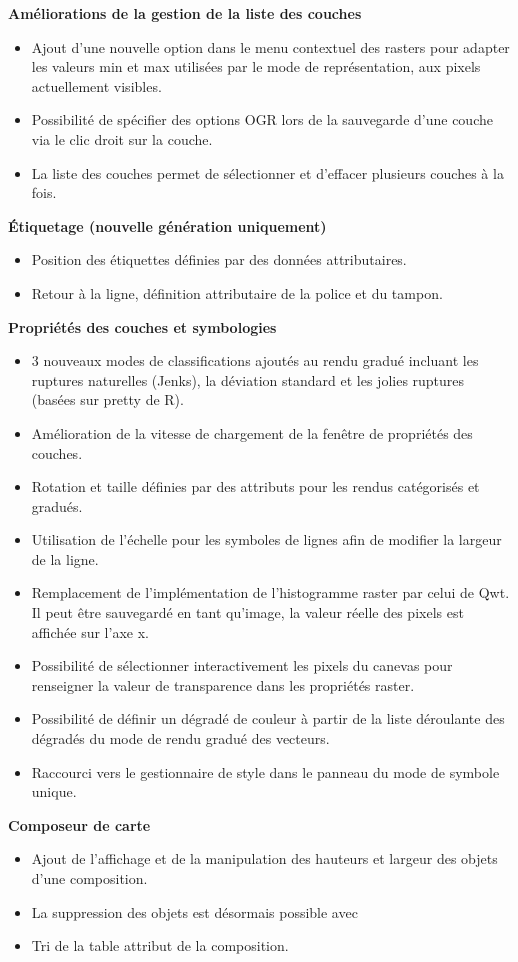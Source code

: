 \textbf{Améliorations de la gestion de la liste des couches}

\begin{itemize}[label=--]
\item Ajout d'une nouvelle option dans le menu contextuel des rasters pour adapter les valeurs min et max utilisées par le mode de représentation, aux pixels actuellement visibles. 
\item Possibilité de spécifier des options OGR lors de la sauvegarde d'une couche via le clic droit sur la couche.
\item La liste des couches permet de sélectionner et d'effacer plusieurs couches à la fois.
\end{itemize}

\textbf{Étiquetage (nouvelle génération uniquement)}

\begin{itemize}[label=--]
\item Position des étiquettes définies par des données attributaires.
\item Retour à la ligne, définition attributaire de la police et du tampon.
\end{itemize}

\textbf{Propriétés des couches et symbologies}

\begin{itemize}[label=--]
\item 3 nouveaux modes de classifications ajoutés au rendu gradué incluant les ruptures naturelles (Jenks), la déviation standard et les jolies ruptures (basées sur pretty de R).
\item Amélioration de la vitesse de chargement de la fenêtre de propriétés des couches.
\item Rotation et taille définies par des attributs pour les rendus catégorisés et gradués.
\item Utilisation de l'échelle pour les symboles de lignes afin de modifier la largeur de la ligne.
\item Remplacement de l'implémentation de l'histogramme raster par celui de Qwt. Il peut être sauvegardé en tant qu'image, la valeur réelle des pixels est affichée sur l'axe x.
\item Possibilité de sélectionner interactivement les pixels du canevas pour renseigner la valeur de transparence dans les propriétés raster.
\item Possibilité de définir un dégradé de couleur à partir de la liste déroulante des dégradés du mode de rendu gradué des vecteurs.
\item Raccourci vers le gestionnaire de style dans le panneau du mode de symbole unique.
\end{itemize}

\textbf{Composeur de carte}

\begin{itemize}[label=--]
\item Ajout de l'affichage et de la manipulation des hauteurs et largeur des objets d'une composition.
\item La suppression des objets est désormais possible avec 
\item Tri de la table attribut de la composition.
\end{itemize}
